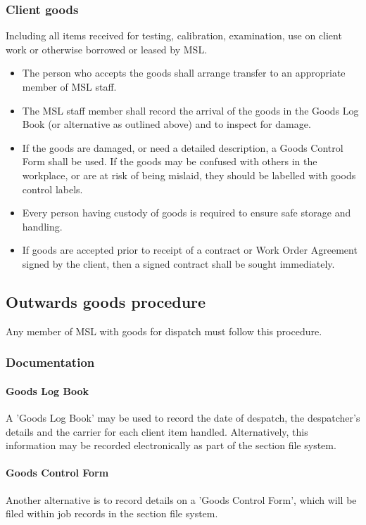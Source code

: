 \subsubsection{Client goods}
Including all items received for testing, calibration, examination, use on client work or otherwise borrowed or leased by MSL. 
\begin{itemize}
\item The person who accepts the goods shall arrange transfer to an appropriate member of MSL staff.
\item The MSL staff member shall record the arrival of the goods in the Goods Log Book (or alternative as outlined above) and to inspect for damage.
\item If the goods are damaged, or need a detailed description, a Goods Control Form shall be used. If the goods may be confused with others in the workplace, or are at risk of being mislaid, they should be labelled with goods control labels. 
\item Every person having custody of goods is required to ensure safe storage and handling. 
\item If goods are accepted prior to receipt of a contract or Work Order Agreement signed by the client, then a signed contract shall be sought immediately.
\end{itemize} 

\subsection{Outwards goods procedure}
Any member of MSL with goods for dispatch must follow this procedure.

\subsubsection{Documentation}
\paragraph{Goods Log Book}
A 'Goods Log Book' may be used to record the date of despatch, the despatcher's details and the carrier for each client item handled. Alternatively, this information may be recorded electronically as part of the section file system.

\paragraph{Goods Control Form}
Another alternative is to record details on a 'Goods Control Form', which will be filed within job records in the section file system. 

